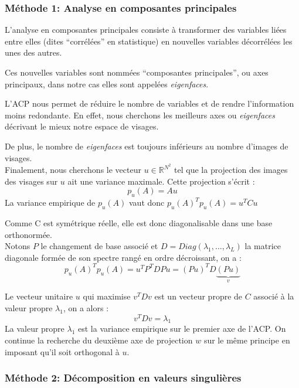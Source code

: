 \documentclass[12pt,french]{article}
\theoremstyle{plain}
\theoremstyle{definition}
\begin{document}
\subsubsection{Méthode 1: Analyse en composantes principales}
L'analyse en composantes principales consiste à transformer des variables liées entre elles (dites ``corrélées'' en statistique) en nouvelles variables décorrélées les unes des autres.

Ces nouvelles variables sont nommées ``composantes principales'', ou axes principaux, dans notre cas elles sont appelées \emph{eigenfaces}.

L'ACP nous permet de réduire le nombre de variables et de rendre l'information moins redondante. En effet, nous cherchons les meilleurs axes ou \emph{eigenfaces} décrivant le mieux notre espace de visages.

De plus, le nombre de \emph{eigenfaces} est toujours inférieurs au nombre d'images de visages.\\

Finalement, nous cherchons le vecteur $u \in \mathbb{R}^{N^2}$ tel que la projection des images des visages sur $u$ ait une variance maximale. Cette projection s'écrit :
\[
  p_u(A)=Au
\]
La variance empirique de $p_u(A)$ vaut donc $p_u(A)^T p_u(A) = u^T C u$

Comme C est symétrique réelle, elle est donc diagonalisable dans une base orthonormée.\\
Notons $P$ le changement de base associé et $D = Diag(\lambda_1, \dots, \lambda_L)$ la matrice diagonale formée de son spectre rangé en ordre décroissant, on a :
\[
  p_u(A)^T p_u(A) = u^T P^T D P u = (Pu)^T D \underbrace{(Pu)}_v
\]

Le vecteur unitaire $u$ qui maximise $v^T D v$  est un vecteur propre de $C$ associé à la valeur propre $\lambda_1$, on a alors :
\[
  v^T D v = \lambda_1
\]
La valeur propre $\lambda_1$ est la variance empirique sur le premier axe de l'ACP.
On continue la recherche du deuxième axe de projection $w$ sur le même principe en imposant qu'il soit orthogonal à $u$.
\subsubsection{Méthode 2: Décomposition en valeurs singulières}
\end{document}

